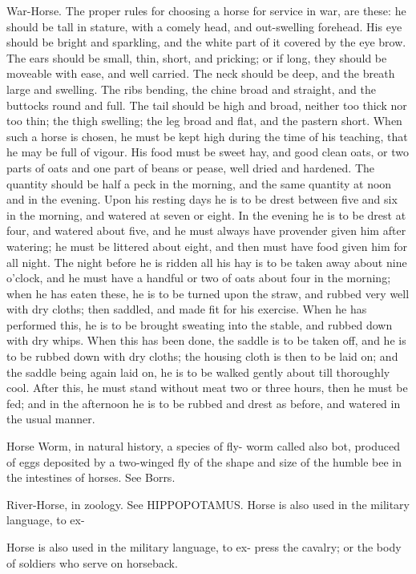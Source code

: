 \documentclass{article}
\begin{document}
War-Horse. The proper rules for choosing a horse for service in war, are these: he should be tall in stature, with a comely head, and out-swelling forehead. His eye should be bright and sparkling, and the white part of it covered by the eye brow. The ears should be small, thin, short, and pricking; or if long, they should be moveable with ease, and well carried. The neck should be deep, and the breath large and swelling. The ribs bending, the chine broad and straight, and the buttocks round and full. The tail should be high and broad, neither too thick nor too thin; the thigh swelling; the leg broad and flat, and the pastern short. When such a horse is chosen, he must be kept high during the time of his teaching, that he may be full of vigour. His food must be sweet hay, and good clean oats, or two parts of oats and one part of beans or pease, well dried and hardened. The quantity should be half a peck in the morning, and the same quantity at noon and in the evening. Upon his resting days he is to be drest between five and six in the morning, and watered at seven or eight. In the evening he is to be drest at four, and watered about five, and he must always have provender given him after watering; he must be littered about eight, and then must have food given him for all night. The night before he is ridden all his hay is to be taken away about nine o'clock, and he must have a handful or two of oats about four in the morning; when he has eaten these, he is to be turned upon the straw, and rubbed very well with dry cloths; then saddled, and made fit for his exercise. When he has performed this, he is to be brought sweating into the stable, and rubbed down with dry whips. When this has been done, the saddle is to be taken off, and he is to be rubbed down with dry cloths; the housing cloth is then to be laid on; and the saddle being again laid on, he is to be walked gently about till thoroughly cool. After this, he must stand without meat two or three hours, then he must be fed; and in the afternoon he is to be rubbed and drest as before, and watered in the usual manner.

Horse Worm, in natural history, a species of fly-
worm called also bot, produced of eggs deposited by a
two-winged fly of the shape and size of the humble
bee in the intestines of horses. See Borrs.

River-Horse, in zoology. See HIPPOPOTAMUS.
Horse is also used in the military language, to ex-

Horse is also used in the military language, to ex-
press the cavalry; or the body of soldiers who serve on
horseback.
\end{document}
